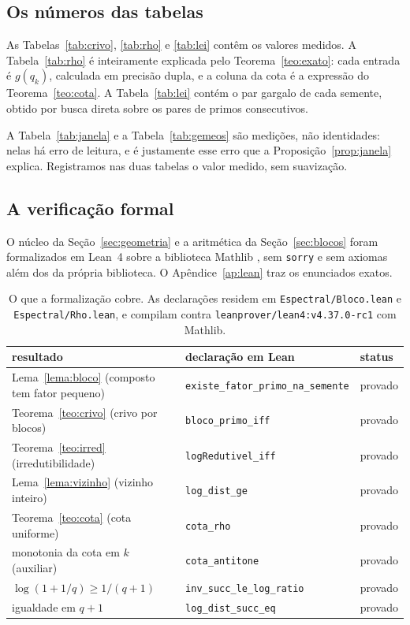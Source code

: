 \subsection{Os números das tabelas}

As Tabelas~\ref{tab:crivo}, \ref{tab:rho} e \ref{tab:lei} contêm os valores
medidos. A Tabela~\ref{tab:rho} é inteiramente explicada pelo
Teorema~\ref{teo:exato}: cada entrada é $g(q_k)$, calculada em precisão dupla, e a
coluna da cota é a expressão do Teorema~\ref{teo:cota}. A Tabela~\ref{tab:lei}
contém o par gargalo de cada semente, obtido por busca direta sobre os pares de
primos consecutivos.

A Tabela~\ref{tab:janela} e a Tabela~\ref{tab:gemeos} são medições, não
identidades: nelas há erro de leitura, e é justamente esse erro que a
Proposição~\ref{prop:janela} explica. Registramos nas duas tabelas o valor medido,
sem suavização.

\subsection{A verificação formal}

O núcleo da Seção~\ref{sec:geometria} e a aritmética da Seção~\ref{sec:blocos}
foram formalizados em Lean~4 sobre a biblioteca Mathlib \cite{mathlib}, sem
\texttt{sorry} e sem axiomas além dos da própria biblioteca. O Apêndice~\ref{ap:lean}
traz os enunciados exatos.

\begin{table}[htbp]
\centering
\small
\begin{tabular}{lll}
\toprule
resultado & declaração em Lean & status \\
\midrule
Lema~\ref{lema:bloco} (composto tem fator pequeno) &
\texttt{existe\_fator\_primo\_na\_semente} & provado \\
Teorema~\ref{teo:crivo} (crivo por blocos) &
\texttt{bloco\_primo\_iff} & provado \\
Teorema~\ref{teo:irred} (irredutibilidade) &
\texttt{logRedutivel\_iff} & provado \\
Lema~\ref{lema:vizinho} (vizinho inteiro) &
\texttt{log\_dist\_ge} & provado \\
Teorema~\ref{teo:cota} (cota uniforme) &
\texttt{cota\_rho} & provado \\
monotonia da cota em $k$ (auxiliar) &
\texttt{cota\_antitone} & provado \\
$\log(1+1/q)\ge 1/(q+1)$ &
\texttt{inv\_succ\_le\_log\_ratio} & provado \\
igualdade em $q+1$ &
\texttt{log\_dist\_succ\_eq} & provado \\
\bottomrule
\end{tabular}
\caption{O que a formalização cobre. As declarações residem em
\texttt{Espectral/Bloco.lean} e \texttt{Espectral/Rho.lean}, e compilam contra
\texttt{leanprover/lean4:v4.37.0-rc1} com Mathlib.}
\label{tab:lean}
\end{table}

